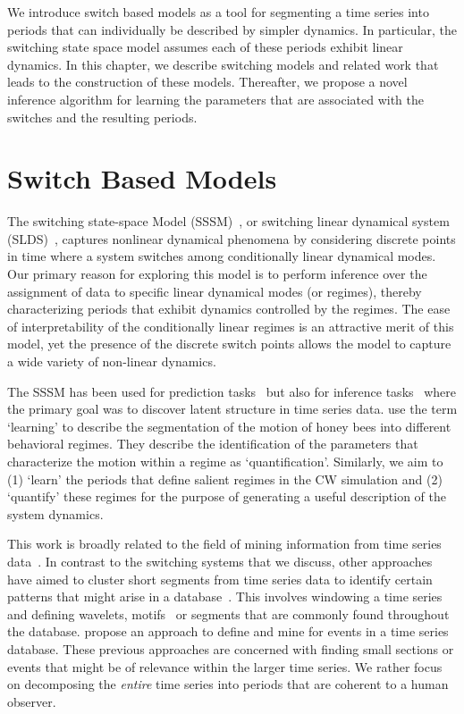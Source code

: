 We introduce switch based models as a tool for segmenting a time series into periods that can individually be described by simpler dynamics. In particular, the switching state space model assumes each of these periods exhibit linear dynamics. In this chapter, we describe switching models and related work that leads to the construction of these models. Thereafter, we propose a novel inference algorithm for learning the parameters that are associated with the switches and the resulting periods.

\section{Switch Based Models}
The switching state-space Model (SSSM)~\citep{ghahramani2000variational}, or switching linear dynamical system (SLDS)~\citep{fox2009nonparametric}, captures nonlinear dynamical phenomena by considering discrete points in time where a system switches among conditionally linear dynamical modes. Our primary reason for exploring this model is to perform inference over the assignment of data to specific linear dynamical modes (or regimes), thereby characterizing periods that exhibit dynamics controlled by the regimes. The ease of interpretability of the conditionally linear regimes is an attractive merit of this model, yet the presence of the discrete switch points allows the model to capture a wide variety of non-linear dynamics.

The SSSM has been used for prediction tasks~\citep{fox2007hierarchical,li2003survey} but also for inference tasks~\citep{fox2009nonparametric,jonsen2007identifying,pavlovic2001learning} where the primary goal was to discover latent structure in time series data. \citet{oh2008learning} use the term `learning' to describe the segmentation of the motion of honey bees into different behavioral regimes. They describe the identification of the parameters that characterize the motion within a regime as `quantification'. Similarly, we aim to (1) `learn' the periods that define salient regimes in the CW simulation and (2) `quantify' these regimes for the purpose of generating a useful description of the system dynamics.

This work is broadly related to the field of mining information from time series data~\citep{esling2012time,horst2004data}. In contrast to the switching systems that we discuss, other approaches have aimed to cluster short segments from time series data to identify certain patterns that might arise in a database~\citep{vlachos2003wavelet,tanaka2005discovery,patel2002mining}. This involves windowing a time series and defining wavelets, motifs~\citep{patel2002mining} or segments that are commonly found throughout the database. \cite{preston2009event} propose an approach to define and mine for events in a time series database. These previous approaches are concerned with finding small sections or events that might be of relevance within the larger time series. We rather focus on decomposing the \textit{entire} time series into periods that are coherent to a human observer.

